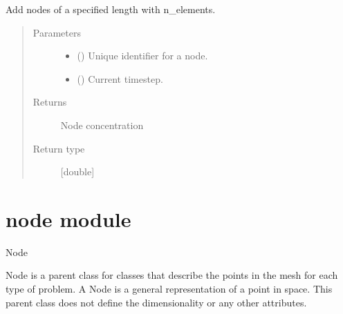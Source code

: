 \documentclass[letterpaper,10pt,english]{sphinxmanual}
\begin{document}
\begin{fulllineitems}
\begin{fulllineitems}
\sphinxAtStartPar
Add nodes of a specified length with n\_elements.
\begin{quote}\begin{description}
\item[{Parameters}] \leavevmode\begin{itemize}
\item {} 
\sphinxAtStartPar
{} (\sphinxstyleliteralemphasis{\sphinxupquote{{[}}}\sphinxstyleliteralemphasis{\sphinxupquote{{]}}}) \textendash{} Unique identifier for a node.

\item {} 
\sphinxAtStartPar
{} (\sphinxstyleliteralemphasis{\sphinxupquote{{[}}}\sphinxstyleliteralemphasis{\sphinxupquote{{]}}}) \textendash{} Current timestep.

\end{itemize}

\item[{Returns}] \leavevmode
\sphinxAtStartPar
Node concentration

\item[{Return type}] \leavevmode
\sphinxAtStartPar
{[}double{]}

\end{description}\end{quote}

\end{fulllineitems}


\end{fulllineitems}



\section{node module}
\label{\detokenize{node:module-node}}\label{\detokenize{node:node-module}}\label{\detokenize{node::doc}}
\sphinxAtStartPar
Node

\sphinxAtStartPar
Node is a parent class for classes that describe the points in the mesh
for each type of problem. A Node is a general representation of a point 
in space. This parent class does not define the dimensionality or any 
other attributes.
\end{document}
